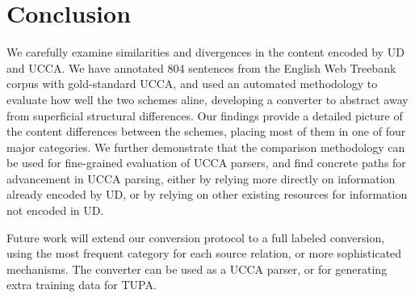 \documentclass[11pt,a4paper]{article}
\begin{document}
\section{Conclusion}\label{sec:conclusion}

We carefully examine similarities and divergences in the content encoded by UD and UCCA. We have annotated 804
sentences from the English Web Treebank corpus with gold-standard UCCA,
and used an automated methodology to
evaluate how well the two schemes aline, developing
a converter to abstract away from superficial structural
differences. Our findings provide a detailed picture of the content differences between the schemes, placing most of them
in one of four major categories. We further demonstrate that the comparison methodology can be used for fine-grained
evaluation of UCCA parsers, and find concrete paths for advancement in UCCA parsing, either by relying more directly on 
information already encoded by UD, or by relying on other existing resources for information not encoded in UD.

Future work will extend our conversion protocol to a full labeled conversion,
using the most frequent category for each source relation,
or more sophisticated mechanisms.
The converter can be used as a UCCA parser,
or for generating extra training data for TUPA.





\end{document}
